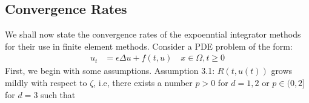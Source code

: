 \subsection{Convergence Rates}
We shall now state the convergence rates of the expoenntial integrator methods\cite{Huang2022} for their use in finite element methods.
Consider a PDE problem of the form:
\begin{align*}
    u_t &= \epsilon \Delta u + f(t,u) \quad x\in \Omega, t\geq 0
\end{align*}
First, we begin with some assumptions.
Assumption 3.1: $R(t,u(t))$ grows mildly with respect to $\zeta$, i.e, there exists a number $p>0$ for $d=1,2$ or $p\in(0,2]$ for $d=3$ such that

